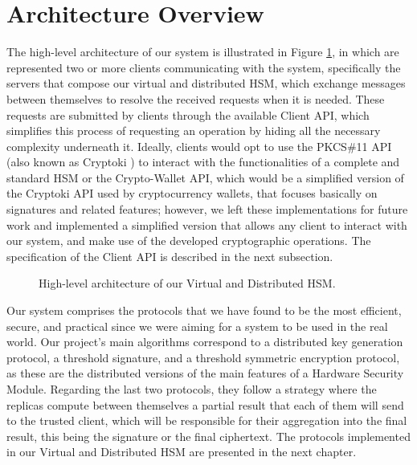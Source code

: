 \section{Architecture Overview} \label{sec:arch-overview}

The high-level architecture of our system is illustrated in Figure \ref{fig:archvdhsm}, in which are represented two or more clients communicating with the system, specifically the servers that compose our virtual and distributed HSM, which exchange messages between themselves to resolve the received requests when it is needed. These requests are submitted by clients through the available Client API, which simplifies this process of requesting an operation by hiding all the necessary complexity underneath it. Ideally, clients would opt to use the PKCS\#11 API (also known as Cryptoki \cite{pkcs11spec}) to interact with the functionalities of a complete and standard HSM or the Crypto-Wallet API, which would be a simplified version of the Cryptoki API used by cryptocurrency wallets, that focuses basically on signatures and related features; however, we left these implementations for future work and implemented a simplified version that allows any client to interact with our system, and make use of the developed cryptographic operations. The specification of the Client API is described in the next subsection.


\begin{figure}[h]
    \begin{center}
    \end{center}
    \caption{High-level architecture of our Virtual and Distributed HSM.}
    \label{fig:archvdhsm}
\end{figure}

Our system comprises the protocols that we have found to be the most efficient, secure, and practical since we were aiming for a system to be used in the real world. Our project's main algorithms correspond to a distributed key generation protocol, a threshold signature, and a threshold symmetric encryption protocol, as these are the distributed versions of the main features of a Hardware Security Module. Regarding the last two protocols, they follow a strategy where the replicas compute between themselves a partial result that each of them will send to the trusted client, which will be responsible for their aggregation into the final result, this being the signature or the final ciphertext. The protocols implemented in our Virtual and Distributed HSM are presented in the next chapter.

